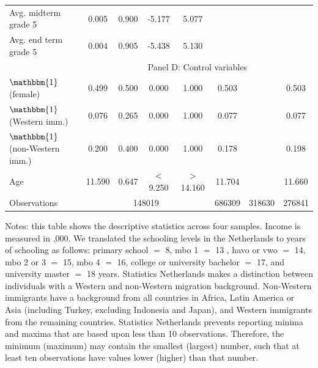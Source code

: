 \begin{table}
\begin{center}
\begin{tabular}{lcccc|ccc}
Avg. midterm grade 5     &       0.005&       0.900&      -5.177&       5.077 &&&\\
Avg. end term grade 5    &       0.004&       0.905&      -5.438&       5.130 &&&\\
[.25em]
&\multicolumn{7}{c}{Panel D: Control variables} \\
$\mathbbm{1}$(female)&       0.499&       0.500&       0.000&       1.000 &0.503&&0.503\\
$\mathbbm{1}$(Western imm.)&       0.076&       0.265&       0.000&       1.000 &0.077&&0.077\\
$\mathbbm{1}$(non-Western imm.)&       0.200&       0.400&       0.000&       1.000 &0.178&&0.198\\
Age                 &      11.590&       0.647&        $< $9.250&      $>$14.160 &11.704&&11.660\\
[.25em]
Observations        &    \multicolumn{4}{c}{148019}      &686309 &318630&  276841  \\
\bottomrule \bottomrule
\end{tabular}
\begin{tablenotes}
\footnotesize
\item[] Notes: this table shows the descriptive statistics across four samples. Income is measured in ,000.
%
We translated the schooling levels in the Netherlands to years of schooling as follows: primary school $=$ 8, mbo 1 $=$ 13 , havo or vwo $=$ 14, mbo 2 or 3 $=$ 15, mbo 4 $=$ 16, college or university bachelor $=$ 17, and university master $=$ 18 years.
%
Statistics Netherlands makes a distinction between individuals with a Western and non-Western migration background. Non-Western immigrants have a background from all countries in Africa, Latin America or Asia (including Turkey, excluding Indonesia and Japan), and Western immigrants from the remaining countries.
%
Statistics Netherlands prevents reporting minima and maxima that are based upon less than 10 observations. Therefore, the minimum (maximum) may contain the smallest (largest) number, such that at least ten observations have values lower (higher) than that number. 
\end{tablenotes}
\end{center}
\end{table}
